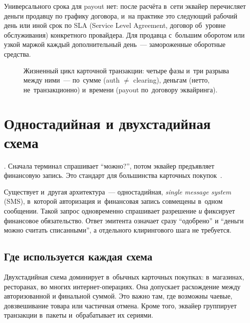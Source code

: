 Универсального срока для payout нет: после расчёта в~сети эквайер
перечисляет деньги продавцу по графику договора, и~на практике
это следующий рабочий день или иной срок по SLA (Service Level
Agreement, договор об~уровне обслуживания) конкретного провайдера. Для продавца с~большим оборотом или узкой маржой каждый
дополнительный день~--- замороженные оборотные средства.

\begin{figure}[tbp]
  \centering
  \caption{Жизненный цикл карточной транзакции: четыре фазы и~три разрыва между ними~--- по~сумме (auth $\ne$ clearing), деньгам (нетто, не~транзакционно) и~времени (payout по~договору эквайринга).}\label{fig:tx-lifecycle-timeline}
\end{figure}

\section{Одностадийная и двухстадийная схема}\label{sec:tx-dual-single}

.
Сначала терминал спрашивает \enquote{можно?}, потом эквайер
предъявляет финансовую запись. Это стандарт для большинства
карточных покупок~\cite{visa-core-rules,mc-tpr}.

Существует и~другая архитектура~--- одностадийная, \textit{single message
system} (SMS), в~которой авторизация и~финансовая запись совмещены в~одном
сообщении. Такой запрос одновременно спрашивает разрешение
\emph{и} фиксирует финансовое обязательство. Ответ эмитента означает
сразу \enquote{одобрено} и \enquote{деньги можно считать списанными},
а отдельного клирингового шага не требуется.

\subsection*{Где используется каждая схема}

Двухстадийная схема доминирует в~обычных карточных покупках:
в~магазинах, ресторанах, во многих интернет-операциях. Она допускает
расхождение между авторизованной и финальной суммой.
Это важно там, где возможны чаевые, довзвешивание товара или
частичная отмена. Кроме того, эквайер группирует транзакции в~пакеты
и~обрабатывает их сериями.

